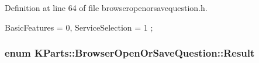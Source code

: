 \-Definition at line 64 of file browseropenorsavequestion.\-h.


\begin{DoxyCode}
                 { BasicFeatures = 0, 
                   ServiceSelection = 1 
    };
\end{DoxyCode}
\hypertarget{classKParts_1_1BrowserOpenOrSaveQuestion_a12842198b7684e9e246e9a207eabc93f}{
\subsubsection[{\-Result}]{\setlength{\rightskip}{0pt plus 5cm}enum {\bf \-K\-Parts\-::\-Browser\-Open\-Or\-Save\-Question\-::\-Result}}}\label{classKParts_1_1BrowserOpenOrSaveQuestion_a12842198b7684e9e246e9a207eabc93f}

